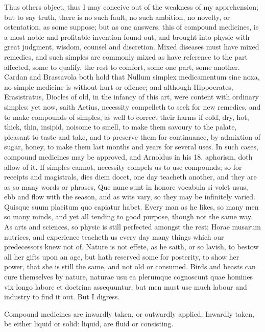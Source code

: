 {Thus others object, thus I may conceive out of the weakness of my
apprehension; but to say truth, there is no such fault, no such
ambition, no novelty, or ostentation, as some suppose; but as one
answers, this of compound medicines, is a most noble and profitable
invention found out, and brought into physic with great judgment,
wisdom, counsel and discretion. Mixed diseases must have mixed
remedies, and such simples are commonly mixed as have reference to the
part affected, some to qualify, the rest to comfort, some one part,
some another. Cardan and Brassavola both hold that Nullum simplex
medicamentum sine noxa, no simple medicine is without hurt or offence;
and although Hippocrates, Erasistratus, Diocles of old, in the infancy
of this art, were content with ordinary simples: yet now, saith
Aetius, necessity compelleth to seek for new remedies, and to
make compounds of simples, as well to correct their harms if cold, dry,
hot, thick, thin, insipid, noisome to smell, to make them savoury to
the palate, pleasant to taste and take, and to preserve them for
continuance, by admixtion of sugar, honey, to make them last months and
years for several uses. In such cases, compound medicines may be
approved, and Arnoldus in his 18. aphorism, doth allow of it. If
simples cannot, necessity compels us to use compounds; so for receipts
and magistrals, dies diem docet, one day teacheth another, and they are
as so many words or phrases, Que nunc sunt in honore vocabula si volet
usus, ebb and flow with the season, and as wits vary, so they may be
infinitely varied. Quisque suum placitum quo capiatur habet. Every man
as he likes, so many men so many minds, and yet all tending to good
purpose, though not the same way. As arts and sciences, so physic is
still perfected amongst the rest; Horae musarum nutrices, and
experience teacheth us every day many things which our
predecessors knew not of. Nature is not effete, as he saith, or so
lavish, to bestow all her gifts upon an age, but hath reserved some for
posterity, to show her power, that she is still the same, and not old
or consumed. Birds and beasts can cure themselves by nature,
naturae usu ea plerumque cognoscunt quae homines vix longo labore
et doctrina assequuntur, but men must use much labour and industry to
find it out. But I digress.

Compound medicines are inwardly taken, or outwardly applied. Inwardly
taken, be either liquid or solid: liquid, are fluid or consisting.

}
